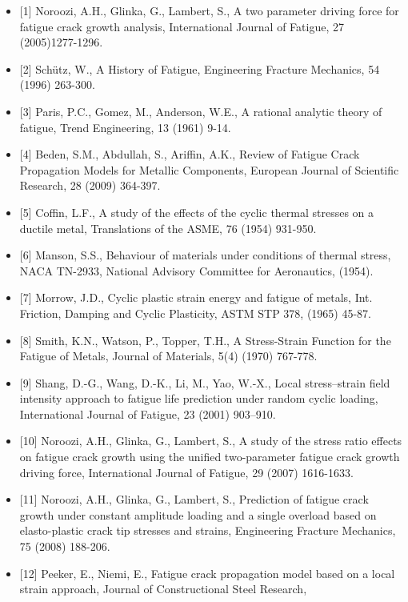 \documentclass[11pt]{article}
\providecommand{\tightlist}{%
      \setlength{\itemsep}{0pt}\setlength{\parskip}{0pt}}
\begin{document}
\begin{itemize}
\tightlist
\item
  {[}1{]} Noroozi, A.H., Glinka, G., Lambert, S., A two parameter
  driving force for fatigue crack growth analysis, International Journal
  of Fatigue, 27 (2005)1277-1296.
\item
  {[}2{]} Schütz, W., A History of Fatigue, Engineering Fracture
  Mechanics, 54 (1996) 263-300.
\item
  {[}3{]} Paris, P.C., Gomez, M., Anderson, W.E., A rational analytic
  theory of fatigue, Trend Engineering, 13 (1961) 9-14.
\item
  {[}4{]} Beden, S.M., Abdullah, S., Ariffin, A.K., Review of Fatigue
  Crack Propagation Models for Metallic Components, European Journal of
  Scientific Research, 28 (2009) 364-397.
\item
  {[}5{]} Coffin, L.F., A study of the effects of the cyclic thermal
  stresses on a ductile metal, Translations of the ASME, 76 (1954)
  931-950.
\item
  {[}6{]} Manson, S.S., Behaviour of materials under conditions of
  thermal stress, NACA TN-2933, National Advisory Committee for
  Aeronautics, (1954).
\item
  {[}7{]} Morrow, J.D., Cyclic plastic strain energy and fatigue of
  metals, Int. Friction, Damping and Cyclic Plasticity, ASTM STP 378,
  (1965) 45-87.
\item
  {[}8{]} Smith, K.N., Watson, P., Topper, T.H., A Stress-Strain
  Function for the Fatigue of Metals, Journal of Materials, 5(4) (1970)
  767-778.
\item
  {[}9{]} Shang, D.-G., Wang, D.-K., Li, M., Yao, W.-X., Local
  stress--strain field intensity approach to fatigue life prediction
  under random cyclic loading, International Journal of Fatigue, 23
  (2001) 903--910.
\item
  {[}10{]} Noroozi, A.H., Glinka, G., Lambert, S., A study of the stress
  ratio effects on fatigue crack growth using the unified two-parameter
  fatigue crack growth driving force, International Journal of Fatigue,
  29 (2007) 1616-1633.
\item
  {[}11{]} Noroozi, A.H., Glinka, G., Lambert, S., Prediction of fatigue
  crack growth under constant amplitude loading and a single overload
  based on elasto-plastic crack tip stresses and strains, Engineering
  Fracture Mechanics, 75 (2008) 188-206.
\item
  {[}12{]} Peeker, E., Niemi, E., Fatigue crack propagation model based
  on a local strain approach, Journal of Constructional Steel Research,

\end{itemize}
\end{document}
